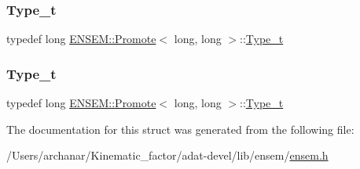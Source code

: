 \subsubsection{\texorpdfstring{Type\_t}{Type\_t}\hspace{0.1cm}{\footnotesize\ttfamily [2/3]}}
{\footnotesize\ttfamily typedef long \mbox{\hyperlink{structENSEM_1_1Promote}{E\+N\+S\+E\+M\+::\+Promote}}$<$ long, long $>$\+::\mbox{\hyperlink{structENSEM_1_1Promote_3_01long_00_01long_01_4_aa01e24c09d90acda8fe0fb2f606bde86}{Type\+\_\+t}}}

\mbox{\label{structENSEM_1_1Promote_3_01long_00_01long_01_4_aa01e24c09d90acda8fe0fb2f606bde86}} 
\subsubsection{\texorpdfstring{Type\_t}{Type\_t}\hspace{0.1cm}{\footnotesize\ttfamily [3/3]}}
{\footnotesize\ttfamily typedef long \mbox{\hyperlink{structENSEM_1_1Promote}{E\+N\+S\+E\+M\+::\+Promote}}$<$ long, long $>$\+::\mbox{\hyperlink{structENSEM_1_1Promote_3_01long_00_01long_01_4_aa01e24c09d90acda8fe0fb2f606bde86}{Type\+\_\+t}}}



The documentation for this struct was generated from the following file\+:\begin{DoxyCompactItemize}
\item 
/\+Users/archanar/\+Kinematic\+\_\+factor/adat-\/devel/lib/ensem/\mbox{\hyperlink{adat-devel_2lib_2ensem_2ensem_8h}{ensem.\+h}}\end{DoxyCompactItemize}
